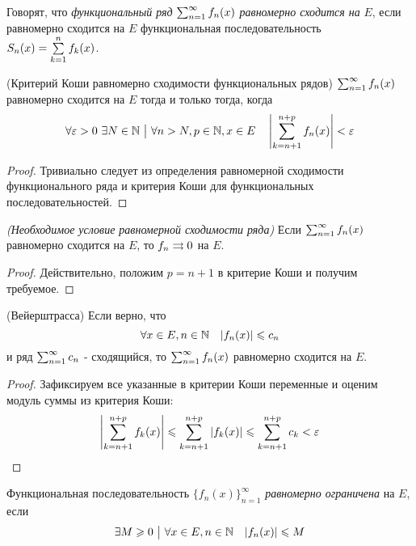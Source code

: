 \begin{definition}
	Говорят, что \textit{функциональный ряд} $\sum_{n = 1}^\infty f_n(x)$ \textit{равномерно сходится на} $E$, если равномерно сходится на $E$ функциональная последовательность $S_n(x) = \sum\limits_{k = 1}^n f_k(x)$.
\end{definition}

\begin{theorem} (Критерий Коши равномерно сходимости функциональных рядов)
	$\sum_{n = 1}^\infty f_n(x)$ равномерно сходится на $E$ тогда и только тогда, когда
	\[
		\forall \varepsilon > 0\ \exists N \in \mathbb{N} \ \big|\  \forall n > N, p \in \mathbb{N}, x \in E \quad \left|\sum\limits_{k = n + 1}^{n + p} f_n(x)\right| < \varepsilon
	\]
\end{theorem}

\begin{proof}
	Тривиально следует из определения равномерной сходимости функционального ряда и критерия Коши для функциональных последовательностей.
\end{proof}

\begin{corollary} \textit{(Необходимое условие равномерной сходимости ряда)}
	Если $\sum_{n = 1}^\infty f_n(x)$ равномерно сходится на $E$, то $f_n \rightrightarrows 0$ на $E$.
\end{corollary}

\begin{proof}
	Действительно, положим $p = n + 1$ в критерие Коши и получим требуемое.
\end{proof}

\begin{theorem} (Вейерштрасса)
	Если верно, что
	\[
		\forall x \in E, n \in \mathbb{N} \quad |f_n(x)| \leqslant c_n
	\]
	и ряд $\sum_{n = 1}^\infty c_n$ - сходящийся, то $\sum_{n = 1}^\infty f_n(x)$ равномерно сходится на $E$.
\end{theorem}

\begin{proof}
	Зафиксируем все указанные в критерии Коши переменные и оценим модуль суммы из критерия Коши:
	\[
		\left|\sum\limits_{k = n + 1}^{n + p} f_k(x)\right| \leqslant \sum\limits_{k = n + 1}^{n + p} |f_k(x)| \leqslant \sum\limits_{k = n + 1}^{n + p} c_k < \varepsilon
	\]
\end{proof}

\begin{definition}
	Функциональная последовательность $\{f_n(x)\}_{n = 1}^\infty$ \textit{равномерно ограничена} на $E$, если
	\[
		\exists M \geqslant 0 \ \big|\  \forall x \in E, n \in \mathbb{N} \quad |f_n(x)| \leqslant M
	\]
\end{definition}

